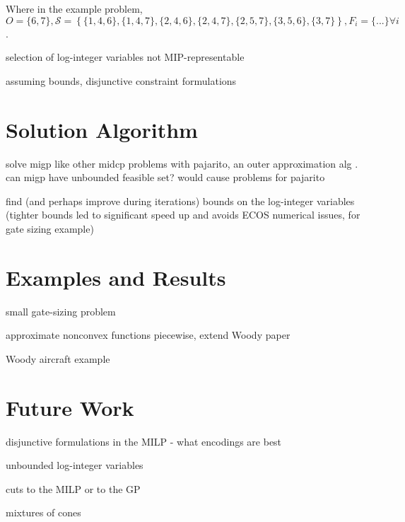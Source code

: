 \documentclass[]{article}
\begin{document}
Where in the example problem, $O = \{6,7\}, \mathcal{S} = \left\{ \{1,4,6\}, \{1,4,7\}, \{2,4,6\}, \{2,4,7\}, \{2,5,7\}, \{3,5,6\}, \{3,7\} \right\}, F_i = \{...\} \forall i$.

selection of log-integer variables not MIP-representable

assuming bounds, disjunctive constraint formulations



\section{Solution Algorithm}

solve migp like other midcp problems with pajarito, an outer approximation alg \cite{lubin15}. can migp have unbounded feasible set? would cause problems for pajarito

find (and perhaps improve during iterations) bounds on the log-integer variables (tighter bounds led to significant speed up and avoids ECOS numerical issues, for gate sizing example)



\section{Examples and Results}

small gate-sizing problem



approximate nonconvex functions piecewise, extend Woody paper \cite{hoburg14b}

Woody aircraft example



\section{Future Work}

disjunctive formulations in the MILP - what encodings are best

unbounded log-integer variables

cuts to the MILP or to the GP

mixtures of cones
\end{document}
